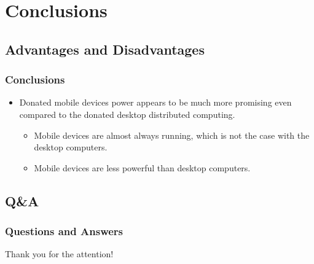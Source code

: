 \documentclass{beamer}
\begin{document}
\section{Conclusions}

\subsection{Advantages and Disadvantages}

\begin{frame}
\frametitle{Conclusions}
\begin{itemize}
  \item Donated mobile devices power appears to be much more promising even compared to the donated desktop distributed computing.
  \begin{itemize}
    \item Mobile devices are almost always running, which is not the case with the desktop computers.
    \item Mobile devices are less powerful than desktop computers.
  \end{itemize}
\end{itemize}
\end{frame}

\subsection{Q\&A}

\begin{frame}
\frametitle{Questions and Answers}
\center \huge{Thank you for the attention!}
\end{frame}
\end{document}
